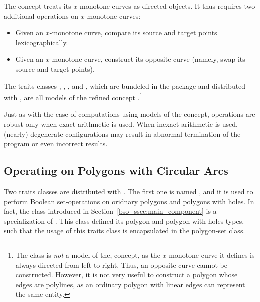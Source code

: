 The  concept treats its
$x$-monotone curves as directed objects. It thus requires two additional
operations on $x$-monotone curves:
\begin{itemize}
\item Given an $x$-monotone curve, compare its source and target points
lexicographically.
\item Given an $x$-monotone curve, construct its opposite curve (namely,
swap its source and target points).
\end{itemize}

The traits classes , 
, ,
 and , which are 
bundeled in the  package and distributed with \cgal,
are all models of the refined concept 
.\footnote{The
 class is {\em not} a model of the, 
 concept, as the
$x$-monotone curve it defines is always directed from left to
right. Thus, an opposite curve cannot be constructed. However, it is
not very useful to construct a polygon whose edges are polylines, as
an ordinary polygon with linear edges can represent the same entity.}

Just as with the case of computations using models of the 
 concept, operations are robust only
when exact arithmetic is used. When inexact arithmetic is used,
(nearly) degenerate configurations may result in abnormal termination
of the program or even incorrect results.

\subsection{Operating on Polygons with Circular Arcs\label{bso_ssec:circ_seg}}

Two traits classes are distributed with \cgal. The first one is named
, and it is used to perform Boolean
set-operations on oridnary polygons and polygons with holes. In fact,
the class  introduced in
Section~\ref{bso_ssec:main_component} is a specialization of
. This class defined
its polygon and polygon with holes types, such that the usage of this
traits class is encapsulated in the polygon-set class.

